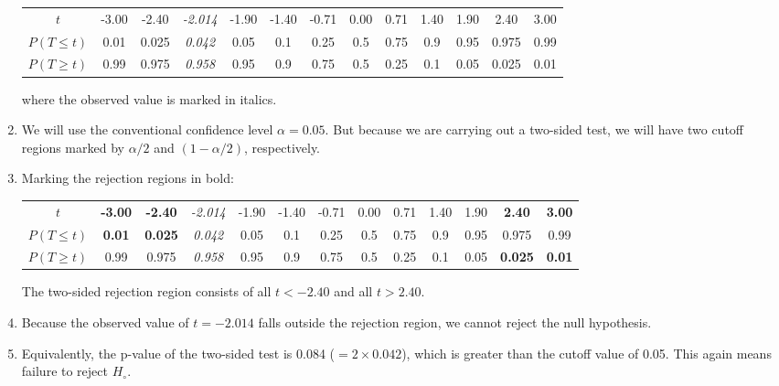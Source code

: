 \begin{enumerate}
  \begin{center}
    \begin{tabular}{c|c@{\gap}c@{\gap}c@{\gap}c@{\gap}
        c@{\gap}c@{\gap}c@{\gap}c@{\gap}c@{\gap}c@{\gap}c@{\gap}c}
      $t$ & -3.00 & -2.40 & \emph{-2.014} & -1.90 & -1.40 & -0.71 &
      0.00 & 0.71 & 1.40 & 1.90 & 2.40 & 3.00 \\
      $P(T\leq{t})$ & 0.01 & 0.025 & \emph{0.042} & 0.05 & 0.1 & 0.25 &
      0.5 & 0.75 & 0.9 & 0.95 & 0.975 & 0.99 \\
      $P(T\geq{t})$ & 0.99 & 0.975 & \emph{0.958} & 0.95 & 0.9 & 0.75 & 0.5 &
      0.25 & 0.1 & 0.05 & 0.025 & 0.01
    \end{tabular}
  \end{center}

  \noindent where the observed value is marked in italics.
  
\item We will use the conventional confidence level $\alpha =
  0.05$. But because we are carrying out a two-sided test, we will
  have two cutoff regions marked by $\alpha/2$ and $(1-\alpha/2)$,
  respectively.

\item Marking the rejection regions in bold:
  
  \begin{center}
    \begin{tabular}{c|c@{\gap}c@{\gap}c@{\gap}c@{\gap}
        c@{\gap}c@{\gap}c@{\gap}c@{\gap}c@{\gap}c@{\gap}c@{\gap}c}
      $t$ & \textbf{-3.00} & \textbf{-2.40} & \emph{-2.014} &
      -1.90 & -1.40 & -0.71 & 0.00 & 0.71 & 1.40 & 1.90 &
      \textbf{2.40} & \textbf{3.00} \\
      $P(T\leq{t})$ & \textbf{0.01} & \textbf{0.025} &
      \emph{0.042} & 0.05 & 0.1 & 0.25 &
      0.5 & 0.75 & 0.9 & 0.95 & 0.975 & 0.99 \\
      $P(T\geq{t})$ & 0.99 & 0.975 & \emph{0.958} & 0.95 & 0.9 & 0.75 & 0.5 &
      0.25 & 0.1 & 0.05 & \textbf{0.025} & \textbf{0.01}
    \end{tabular}
  \end{center}

  The two-sided rejection region consists of all $t<-2.40$ and all
  $t>{2.40}$.

\item Because the observed value of $t=-2.014$ falls outside the
  rejection region, we cannot reject the null hypothesis.

\item Equivalently, the p-value of the two-sided test is 0.084
  ($=2\times{0.042}$), which is greater than the cutoff value of 0.05.
  This again means failure to reject $H_\circ$.
  
\end{enumerate}


